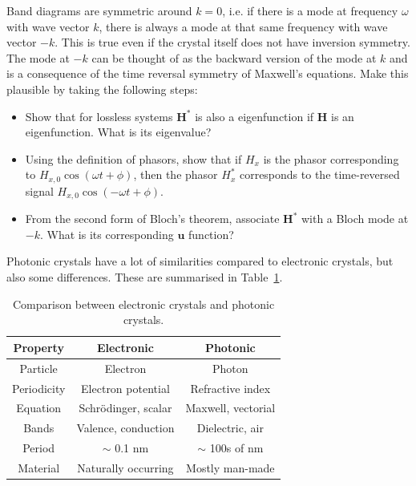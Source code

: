 \begin{exer}
Band diagrams are symmetric around $k=0$, i.e. if there is a mode at frequency $\omega$ with wave vector $k$, there is always a mode at that same frequency with wave vector $-k$. This is true even if the crystal itself does not have inversion symmetry. The mode at $-k$ can be thought of as the backward version of the mode at $k$ and is a consequence of the time reversal symmetry of Maxwell's equations. Make this plausible by taking the following steps:
\begin{itemize}
\item Show that for lossless systems ${\mathbf H}^*$ is also a eigenfunction if ${\mathbf H}$ is an eigenfunction. What is its eigenvalue?
\item Using the definition of phasors, show that if $H_x$ is the phasor corresponding to $ H_{x,0} \cos \left( \omega t + \phi \right)$, then the phasor $H^*_x$ corresponds to the time-reversed signal $ H_{x,0} \cos \left(- \omega t + \phi  \right)$.
\item From the second form of Bloch's theorem, associate ${\mathbf H}^*$ with a Bloch mode at $-k$. What is its corresponding ${\mathbf u}$ function?
\end{itemize}

\end{exer}

\pagebreak

\label{week10}

Photonic crystals have a lot of similarities compared to electronic crystals, but also some differences. These are summarised in Table~\ref{tab-phot-cryst}.

\begin{table}[h!]
  \begin{center}
    \begin{tabular}{c|c|c} 
      \textbf{Property} & \textbf{Electronic} & \textbf{Photonic}\\
      \hline
      Particle & Electron & Photon \\
      Periodicity & Electron potential & Refractive index \\
      Equation & Schr\"{o}dinger, scalar & Maxwell, vectorial \\
      Bands & Valence, conduction & Dielectric, air \\
      Period & $\sim$ 0.1 nm & $\sim$ 100s of nm \\
      Material & Naturally occurring & Mostly man-made \\
    \end{tabular}
  \end{center}
  \caption{Comparison between electronic crystals and photonic crystals.}
  \label{tab-phot-cryst}
\end{table}

